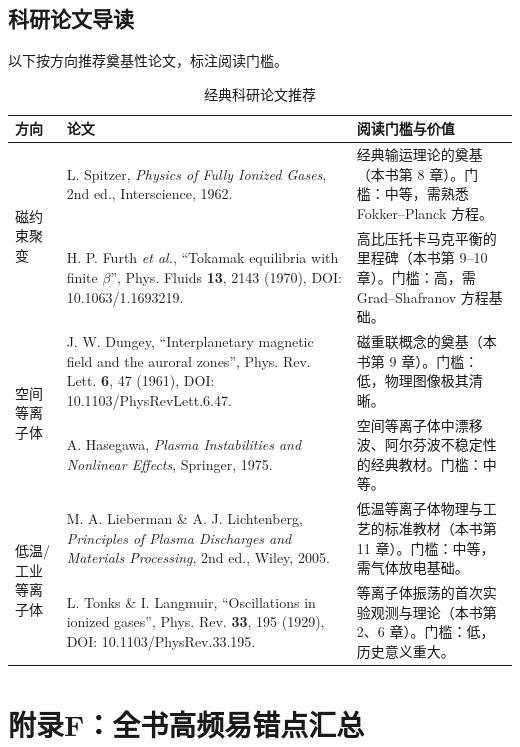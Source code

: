\documentclass[12pt,a4paper,openany,oneside]{book}
\begin{document}
\section{科研论文导读}

以下按方向推荐奠基性论文，标注阅读门槛。

\begin{table}[htbp]
\centering
\caption{经典科研论文推荐}
\label{tab:papers}
\small
\begin{tabular}{@{}p{2.5cm}p{5.5cm}p{5.5cm}@{}}
\toprule
\textbf{方向} & \textbf{论文} & \textbf{阅读门槛与价值} \\
\midrule
\multirow{2}{2.5cm}{磁约束聚变} & L. Spitzer, \textit{Physics of Fully Ionized Gases}, 2nd ed., Interscience, 1962. & 经典输运理论的奠基（本书第 8 章）。门槛：中等，需熟悉 Fokker--Planck 方程。 \\
 & H. P. Furth \textit{et al.}, ``Tokamak equilibria with finite $\beta$'', Phys. Fluids \textbf{13}, 2143 (1970), DOI: 10.1063/1.1693219. & 高比压托卡马克平衡的里程碑（本书第 9--10 章）。门槛：高，需 Grad--Shafranov 方程基础。 \\
\midrule
\multirow{2}{2.5cm}{空间等离子体} & J. W. Dungey, ``Interplanetary magnetic field and the auroral zones'', Phys. Rev. Lett. \textbf{6}, 47 (1961), DOI: 10.1103/PhysRevLett.6.47. & 磁重联概念的奠基（本书第 9 章）。门槛：低，物理图像极其清晰。 \\
 & A. Hasegawa, \textit{Plasma Instabilities and Nonlinear Effects}, Springer, 1975. & 空间等离子体中漂移波、阿尔芬波不稳定性的经典教材。门槛：中等。 \\
\midrule
\multirow{2}{2.5cm}{低温/工业等离子体} & M. A. Lieberman \& A. J. Lichtenberg, \textit{Principles of Plasma Discharges and Materials Processing}, 2nd ed., Wiley, 2005. & 低温等离子体物理与工艺的标准教材（本书第 11 章）。门槛：中等，需气体放电基础。 \\
 & L. Tonks \& I. Langmuir, ``Oscillations in ionized gases'', Phys. Rev. \textbf{33}, 195 (1929), DOI: 10.1103/PhysRev.33.195. & 等离子体振荡的首次实验观测与理论（本书第 2、6 章）。门槛：低，历史意义重大。 \\
\bottomrule
\end{tabular}
\end{table}


\chapter*{附录F：全书高频易错点汇总}
\end{document}
